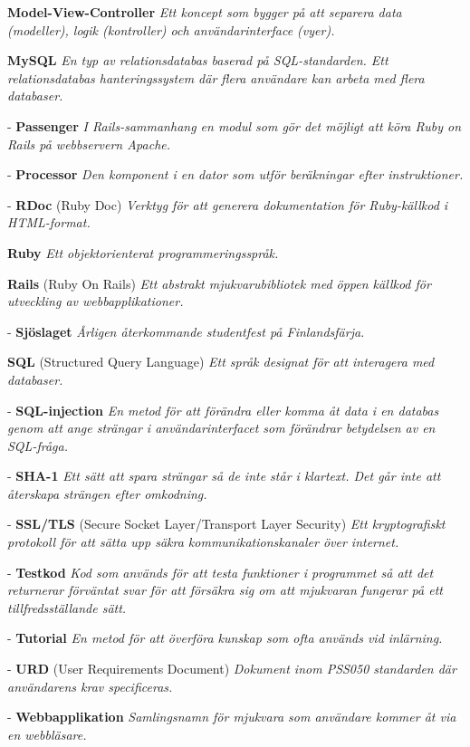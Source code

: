 \documentclass[a4paper, twoside, 11pt, titlepage]{article}
\begin{document}
	\textbf{Model-View-Controller} \emph{Ett koncept som bygger på att separera data (modeller), logik (kontroller) och användarinterface (vyer).}

	\textbf{MySQL} \emph{En typ av relationsdatabas baserad på SQL-standarden. Ett relationsdatabas hanteringssystem där flera användare kan arbeta med flera databaser.}

	- \textbf{Passenger} \emph{I Rails-sammanhang en modul som gör det möjligt att köra Ruby on Rails på webbservern Apache.}

	- \textbf{Processor} \emph{Den komponent i en dator som utför beräkningar efter instruktioner.}

	- \textbf{RDoc} (Ruby Doc) \emph{Verktyg för att generera dokumentation för Ruby-källkod i HTML-format.}

	\textbf{Ruby} \emph{Ett objektorienterat programmeringsspråk.}

	\textbf{Rails} (Ruby On Rails) \emph{Ett abstrakt mjukvarubibliotek med öppen källkod för utveckling av webbapplikationer.}

	- \textbf{Sjöslaget} \emph{Årligen återkommande studentfest på Finlandsfärja.}

	\textbf{SQL} (Structured Query Language) \emph{Ett språk designat för att interagera med databaser.}

	- \textbf{SQL-injection} \emph{En metod för att förändra eller komma åt data i en databas genom att ange strängar i användarinterfacet som förändrar betydelsen av en SQL-fråga.}

	- \textbf{SHA-1} \emph{Ett sätt att spara strängar så de inte står i klartext. Det går inte att återskapa strängen efter omkodning.}

	- \textbf{SSL/TLS} (Secure Socket Layer/Transport Layer Security) \emph{Ett kryptografiskt protokoll för att sätta upp säkra kommunikationskanaler över internet.}

	- \textbf{Testkod} \emph{Kod som används för att testa funktioner i programmet så att det returnerar förväntat svar för att försäkra sig om att mjukvaran fungerar på ett tillfredsställande sätt.}

	- \textbf{Tutorial} \emph{En metod för att överföra kunskap som ofta används vid inlärning.}

	- \textbf{URD} (User Requirements Document) \emph{Dokument inom PSS050 standarden där användarens krav specificeras.}

	- \textbf{Webbapplikation} \emph{Samlingsnamn för mjukvara som användare kommer åt via en webbläsare.}
\end{document}
